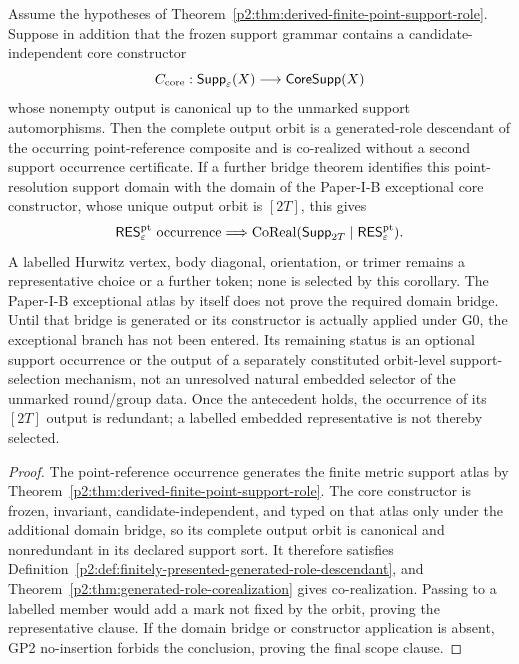 \documentclass[11pt,a4paper]{article}
\begin{document}
\begin{corollary}
\label{p2:cor:core-support-inheritance-no-duplicate-witness}
Assume the hypotheses of
Theorem~\ref{p2:thm:derived-finite-point-support-role}.  Suppose in addition
that the frozen support grammar contains a candidate-independent core
constructor
\[
 C_{\rm core}:\mathsf{Supp}_\varepsilon(X)\longrightarrow
 \mathsf{CoreSupp}(X)
\]
whose nonempty output is canonical up to the unmarked support automorphisms.
Then the complete output orbit is a generated-role descendant of the occurring
point-reference composite and is co-realized without a second support
occurrence certificate.  If a further bridge theorem identifies this
point-resolution support domain with the domain of the Paper-I-B exceptional
core constructor, whose unique output orbit is \([2T]\), this gives
\[
 \mathsf{RES}^{\rm pt}_\varepsilon\text{ occurrence}
 \Longrightarrow
 \operatorname{CoReal}(\mathsf{Supp}_{2T}\mid
                        \mathsf{RES}^{\rm pt}_\varepsilon).
\]
A labelled Hurwitz vertex, body diagonal, orientation, or trimer remains a
representative choice or a further token; none is selected by this corollary.
The Paper-I-B exceptional atlas by itself does not prove the required domain
bridge.  Until that bridge is generated or its constructor is actually
applied under G0, the exceptional branch has not been entered.  Its remaining
status is an optional support occurrence or the output of a separately
constituted orbit-level support-selection mechanism, not an unresolved
natural embedded selector of the unmarked round/group data.  Once the
antecedent holds, the occurrence of its \([2T]\) output is redundant; a
labelled embedded representative is not thereby selected.
\end{corollary}

\begin{proof}
The point-reference occurrence generates the finite metric support atlas by
Theorem~\ref{p2:thm:derived-finite-point-support-role}.  The core constructor
is frozen, invariant, candidate-independent, and typed on that atlas only
under the additional domain bridge, so its complete output orbit
is canonical and nonredundant in its declared support sort.  It therefore
satisfies Definition~\ref{p2:def:finitely-presented-generated-role-descendant},
and Theorem~\ref{p2:thm:generated-role-corealization} gives co-realization.
Passing to a labelled member would add a mark not fixed by the orbit, proving
the representative clause.  If the domain bridge or constructor application
is absent, GP2 no-insertion forbids the conclusion, proving the final scope
clause.
\end{proof}
\end{document}
